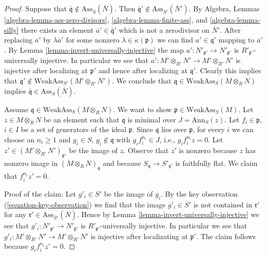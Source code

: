\begin{proof}
\medskip\noindent
Suppose that
$\overline{\mathfrak q} \not \in \text{Ass}_{\overline{S}}(\overline{N})$.
Then
$\overline{\mathfrak q}' \not \in \text{Ass}_{\overline{S}'}(\overline{N}')$.
By
Algebra, Lemmas \ref{algebra-lemma-ass-zero-divisors},
\ref{algebra-lemma-finite-ass}, and
\ref{algebra-lemma-silly}
there exists an element $\overline{a}' \in \overline{\mathfrak q}'$
which is not a zerodivisor on $\overline{N}'$.
After replacing $\overline{a}'$ by $\lambda \overline{a}'$ for some nonzero
$\lambda \in \kappa(\mathfrak p)$ we can find
$a' \in \mathfrak q'$ mapping to $\overline{a}'$. By
Lemma \ref{lemma-invert-universally-injective}
the map $a' : N'_{\mathfrak p'} \to N'_{\mathfrak p'}$ is
$R'_{\mathfrak p'}$-universally injective. In particular
we see that $a' : M' \otimes_{R'} N' \to M' \otimes_{R'} N'$ is
injective after localizing at $\mathfrak p'$ and hence after
localizing at $\mathfrak q'$. Clearly this implies that
$\mathfrak q' \not \in \text{WeakAss}_{S'}(M' \otimes_{R'} N')$.
We conclude that $\mathfrak q \in \text{WeakAss}_S(M \otimes_R N)$ implies
$\overline{\mathfrak q} \in \text{Ass}_{\overline{S}}(\overline{N})$.

\medskip\noindent
Assume $\mathfrak q \in \text{WeakAss}_S(M \otimes_R N)$. We want
to show $\mathfrak p \in \text{WeakAss}_S(M)$.
Let $z \in M \otimes_R N$ be an element such that $\mathfrak q$
is minimal over $J = \text{Ann}_S(z)$.
Let $f_i \in \mathfrak p$, $i \in I$ be a set of generators of the
ideal $\mathfrak p$. Since $\mathfrak q$ lies over $\mathfrak p$, for every $i$
we can choose an $n_i \geq 1$ and $g_i \in S$, $g_i \not \in \mathfrak q$
with $g_i f_i^{n_i} \in J$, i.e., $g_i f_i^{n_i} z = 0$.
Let $z' \in (M' \otimes_{R'} N')_{\mathfrak p'}$ be the image of $z$.
Observe that $z'$ is nonzero because $z$ has nonzero image in
$(M \otimes_R N)_\mathfrak q$ and because $S_\mathfrak q \to S'_{\mathfrak q'}$
is faithfully flat. We claim that $f_i^{n_i} z' = 0$.

\medskip\noindent
Proof of the claim: Let $g'_i \in S'$ be the image of $g_i$.
By the key observation (\ref{equation-key-observation})
we find that the image $\overline{g}'_i \in \overline{S}'$
is not contained in $\mathfrak r'$ for any
$\mathfrak r' \in \text{Ass}_{\overline{S}'}(\overline{N})$.
Hence by Lemma \ref{lemma-invert-universally-injective}
we see that $g'_i : N'_{\mathfrak p'} \to N'_{\mathfrak p'}$ is
$R'_{\mathfrak p'}$-universally injective. In particular
we see that $g'_i : M' \otimes_{R'} N' \to M' \otimes_{R'} N'$ is
injective after localizating at $\mathfrak p'$. The claim
follows because $g_i f_i^{n_i} z' = 0$.


\end{proof}
